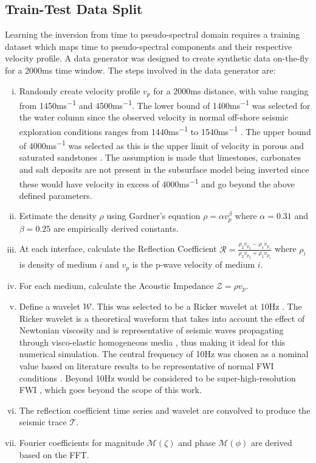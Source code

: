\subsection{Train-Test Data Split}\label{sec:results_Train-Test_Data}
Learning the inversion from time to pseudo-spectral domain requires a training dataset which maps time to pseudo-spectral components and their respective velocity profile. A data generator was designed to create synthetic data on-the-fly for a 2000\si{ms} time window. The steps involved in the data generator are:
\begin{enumerate}[i)]
    \item Randomly create velocity profile $v_p$ for a 2000ms distance, with value ranging from 1450\si{ms^{-1}} and 4500\si{ms^{-1}}. The lower bound of 1400\si{ms^{-1}} was selected for the water column since the observed velocity in normal off-shore seismic exploration conditions ranges from 1440\si{ms^{-1}} to 1540\si{ms^{-1}} \citep{Cochrane1991}. The upper bound of 4000\si{ms^{-1}} was selected as this is the upper limit of velocity in porous and saturated sandstones \citep{Lee1996}. The assumption is made that limestones, carbonates and salt deposits are not present in the subsurface model being inverted since these would have velocity in excess of 4000\si{ms^{-1}} and go beyond the above defined parameters.
    \item Estimate the density $\rho$ using Gardner’s equation \citep{Gardner1974} $\rho=\alpha v_p^{\beta}$ where $\alpha=0.31$ and $\beta=0.25$ are empirically derived constants.
    \item At each interface, calculate the Reflection Coefficient $\mathcal{R}=\frac{\rho_2v_{p_{2}} - \rho_1v_{p_{1}}}{\rho_2v_{p_{2}} + \rho_1v_{p_{1}}}$ where $\rho_i$ is density of medium $i$ and $v_p$ is the p-wave velocity of medium $i$.
	\item For each medium, calculate the Acoustic Impedance $\mathcal{Z}=\rho v_p$.
    \item Define a wavelet $\mathcal{W}$. This was selected to be a Ricker wavelet at 10\si{Hz} \citep{Ryan1994}. The Ricker wavelet is a theoretical waveform that takes into account the effect of Newtonian viscosity and is representative of seismic waves propagating through visco-elastic homogeneous media \citep{wang2015frequencies}, thus making it ideal for this numerical simulation. The central frequency of 10\si{Hz} was chosen as a nominal value based on literature results to be representative of normal FWI conditions \citep{Morgan2013}. Beyond 10\si{Hz} would be considered to be super-high-resolution FWI \citep{mispel2019high}, which goes beyond the scope of this work.
	\item The reflection coefficient time series and wavelet are convolved to produce the seismic trace $\mathcal{T}$.
	\item Fourier coefficients for magnitude $\mathcal{M}(\zeta)$ and phase $\mathcal{M}(\phi)$ are derived based on the \ac{FFT}.
\end{enumerate} 

